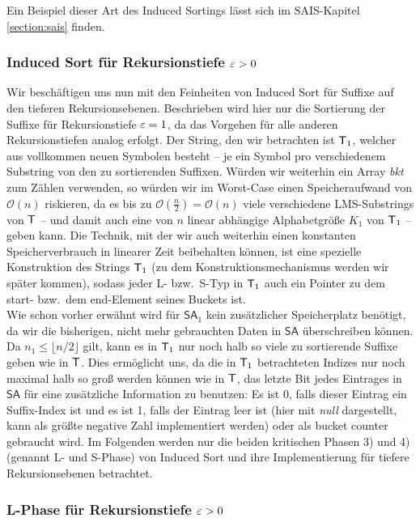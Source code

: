 Ein Beispiel dieser Art des Induced Sortings lässt sich im SAIS-Kapitel \ref{section:sais} finden.

\subsubsection{ Induced Sort für Rekursionstiefe $\varepsilon > 0$}

Wir beschäftigen uns nun mit den Feinheiten von Induced Sort für Suffixe auf den tieferen Rekursionsebenen. Beschrieben wird hier nur die Sortierung der Suffixe für Rekursionstiefe $\varepsilon = 1$, da das Vorgehen für alle anderen Rekursionstiefen analog erfolgt. Der String, den wir betrachten ist $\inputtext_1$, welcher aus vollkommen neuen Symbolen besteht -- je ein Symbol pro verschiedenem Substring von den zu sortierenden Suffixen. Würden wir weiterhin ein Array \textit{bkt} zum Zählen verwenden, so würden wir im Worst-Case einen Speicheraufwand von $\mathcal O(n)$ riskieren, da es bis zu $\mathcal O(\frac{n}{2}) = \mathcal O(n)$ viele verschiedene LMS-Substrings von $\inputtext$ -- und damit auch eine von $n$ linear abhängige Alphabetgröße $K_1$ von $\inputtext_1$ -- geben kann. Die Technik, mit der wir auch weiterhin einen konstanten Speicherverbrauch in linearer Zeit beibehalten können, ist eine spezielle Konstruktion des Strings $\inputtext_1$ (zu dem Konstruktionsmechanismus werden wir später kommen), sodass jeder L- bzw.\ S-Typ in $\inputtext_1$ auch ein Pointer zu dem start- bzw.\ dem end-Element seines Buckets ist.  \\
Wie schon vorher erwähnt wird für $\mathsf{SA}_1$ kein zusätzlicher Speicherplatz benötigt, da wir die bisherigen, nicht mehr gebrauchten Daten in $\mathsf{SA}$ überschreiben können. Da $n_1  \leq \lfloor n/2 \rfloor$ gilt, kann es in $\inputtext_1$ nur noch halb so viele zu sortierende Suffixe geben wie in $\inputtext$. Dies ermöglicht uns, da die in $\inputtext_1$ betrachteten Indizes nur noch maximal halb so groß werden können wie in $\inputtext$, das letzte Bit jedes Eintrages in $\mathsf{SA}$ für eine zusätzliche Information zu benutzen: Es ist 0, falls dieser Eintrag ein Suffix-Index ist und es ist 1, falls der Eintrag leer ist (hier mit \textit{null} dargestellt, kann als größte negative Zahl implementiert werden) oder als bucket counter gebraucht wird. Im Folgenden werden nur die beiden kritischen Phasen 3) und 4) (genannt L- und S-Phase) von Induced Sort und ihre Implementierung für tiefere Rekursionsebenen betrachtet.

\subsubsection{ L-Phase für Rekursionstiefe $\varepsilon > 0$}

